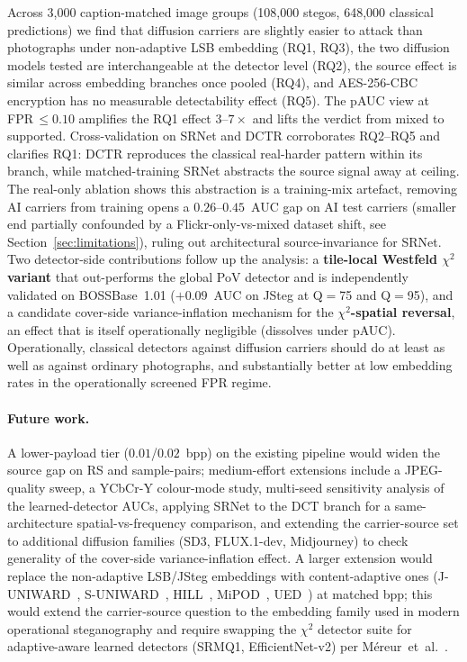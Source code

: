\documentclass[10pt,twocolumn,a4paper]{article}
\begin{document}
Across 3{,}000 caption-matched image groups (108{,}000 stegos, 648{,}000 classical predictions) we find that diffusion carriers are slightly easier to attack than photographs under non-adaptive LSB embedding (RQ1, RQ3), the two diffusion models tested are interchangeable at the detector level (RQ2), the source effect is similar across embedding branches once pooled (RQ4), and AES-256-CBC encryption has no measurable detectability effect (RQ5). The pAUC view at FPR\,$\leq\!0.10$ amplifies the RQ1 effect $3$--$7\times$ and lifts the verdict from mixed to supported. Cross-validation on SRNet and DCTR corroborates RQ2--RQ5 and clarifies RQ1: DCTR reproduces the classical real-harder pattern within its branch, while matched-training SRNet abstracts the source signal away at ceiling. The real-only ablation shows this abstraction is a training-mix artefact, removing AI carriers from training opens a $0.26$--$0.45$~AUC gap on AI test carriers (smaller end partially confounded by a Flickr-only-vs-mixed dataset shift, see Section~\ref{sec:limitations}), ruling out architectural source-invariance for SRNet. Two detector-side contributions follow up the analysis: a \textbf{tile-local Westfeld $\chi^2$ variant} that out-performs the global PoV detector and is independently validated on BOSSBase~1.01 ($+0.09$~AUC on JSteg at Q$=$75 and Q$=$95), and a candidate cover-side variance-inflation mechanism for the \textbf{$\chi^2$-spatial reversal}, an effect that is itself operationally negligible (dissolves under pAUC). Operationally, classical detectors against diffusion carriers should do at least as well as against ordinary photographs, and substantially better at low embedding rates in the operationally screened FPR regime.

\paragraph{Future work.} A lower-payload tier ($0.01$/$0.02$~bpp) on the existing pipeline would widen the source gap on RS and sample-pairs; medium-effort extensions include a JPEG-quality sweep, a YCbCr-Y colour-mode study, multi-seed sensitivity analysis of the learned-detector AUCs, applying SRNet to the DCT branch for a same-architecture spatial-vs-frequency comparison, and extending the carrier-source set to additional diffusion families (SD3, FLUX.1-dev, Midjourney) to check generality of the cover-side variance-inflation effect. A larger extension would replace the non-adaptive LSB/JSteg embeddings with content-adaptive ones (J-UNIWARD~\cite{holub2014uniward}, S-UNIWARD~\cite{holub2014uniward}, HILL~\cite{li2014hill}, MiPOD~\cite{sedighi2016mipod}, UED~\cite{guo2014ued}) at matched bpp; this would extend the carrier-source question to the embedding family used in modern operational steganography and require swapping the $\chi^2$ detector suite for adaptive-aware learned detectors (SRMQ1, EfficientNet-v2) per M\'ereur~et~al.~\cite{mereur2024deepfake}.
\end{document}
